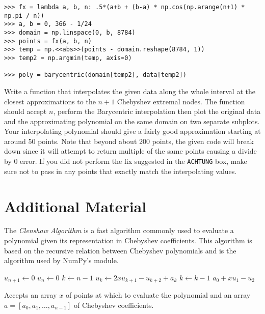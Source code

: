 \begin{lstlisting}
>>> fx = lambda a, b, n: .5*(a+b + (b-a) * np.cos(np.arange(n+1) * np.pi / n))
>>> a, b = 0, 366 - 1/24
>>> domain = np.linspace(0, b, 8784)
>>> points = fx(a, b, n)
>>> temp = np.<<abs>>(points - domain.reshape(8784, 1))
>>> temp2 = np.argmin(temp, axis=0)

>>> poly = barycentric(domain[temp2], data[temp2])
\end{lstlisting}

\begin{problem}
Write a function that interpolates the given data along the whole interval at the closest approximations to the $n+1$ Chebyshev extremal nodes.
The function should accept $n$, perform the Barycentric interpolation then plot the original data and the approximating polynomial on the same domain on two separate subplots.
Your interpolating polynomial should give a fairly good approximation starting at around 50 points.
Note that beyond about 200 points, the given code will break down since it will attempt to return multiple of the same points causing a divide by 0 error.
If you did not perform the fix suggested in the \texttt{ACHTUNG} box, make sure not to pass in any points that exactly match the interpolating values.
\end{problem}

\newpage

\section*{Additional Material}

The \emph{Clenshaw Algorithm} is a fast algorithm commonly used to evaluate a polynomial given its representation in Chebyshev coefficients.
This algorithm is based on the recursive relation between Chebyshev polynomials and is the algorithm used by NumPy's  module.

\begin{algorithm}
\begin{algorithmic}[1]
	\State $u_{n+1} \gets 0$
	\State $u_{n} \gets 0$
	\State $k \gets n-1$
		\State $u_k \gets 2 x u_{k+1} - u_{k+2} + a_k$
		\State $k \gets k-1$
	\EndWhile
	\State {} $a_0 + x u_1 -u_2$
\EndProcedure
\end{algorithmic}
\caption{Accepts an array $x$ of points at which to evaluate the polynomial and an array $a=[a_0,a_1,\dots,a_{n-1}]$ of Chebyshev coefficients.}
\label{alg:clenshaw_recursion}
\end{algorithm}

